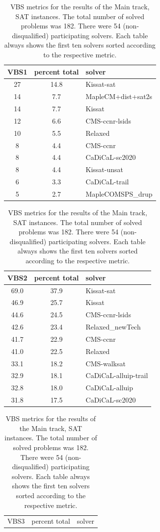 \documentclass{elsarticle}
\begin{document}
\begin{table}
\caption{VBS metrics for the results of the Main track, SAT instances. 
The total number of solved problems was 182. 
There were 54 (non-disqualified) participating solvers.
Each table always shows the first ten solvers sorted according to the respective metric.}
\label{tab:vbsMainSAT}
\begin{center}
\begin{tabular}{ccl}
VBS1 & percent total & solver \\
\hline
27 & 14.8 & Kissat-sat \\
14 & \phantom{0}7.7 & MapleCM+dist+sat2s \\
14 & \phantom{0}7.7 & Kissat \\
12 & \phantom{0}6.6 & CMS-ccnr-lsids \\
10 & \phantom{0}5.5 & Relaxed \\
\phantom{0}8 & \phantom{0}4.4 & CMS-ccnr \\
\phantom{0}8 & \phantom{0}4.4 & CaDiCaL-sc2020 \\
\phantom{0}8 & \phantom{0}4.4 & Kissat-unsat \\
\phantom{0}6 & \phantom{0}3.3 & CaDiCaL-trail \\
\phantom{0}5 & \phantom{0}2.7 & MapleCOMSPS\_drup \\
\end{tabular}
\end{center}
\begin{center}
\begin{tabular}{ccl}
VBS2 & percent total & solver \\
\hline
69.0 & 37.9 & Kissat-sat \\
46.9 & 25.7 & Kissat \\
44.6 & 24.5 & CMS-ccnr-lsids \\
42.6 & 23.4 & Relaxed\_newTech \\
41.7 & 22.9 & CMS-ccnr \\
41.0 & 22.5 & Relaxed \\
33.1 & 18.2 & CMS-walksat \\
32.9 & 18.1 & CaDiCaL-alluip-trail \\
32.8 & 18.0 & CaDiCaL-alluip \\
31.8 & 17.5 & CaDiCaL-sc2020 \\
\end{tabular}
\end{center}
\begin{center}
\begin{tabular}{ccl}
VBS3 & percent total & solver \\

\end{tabular}
\end{center}
\end{table}
\end{document}
